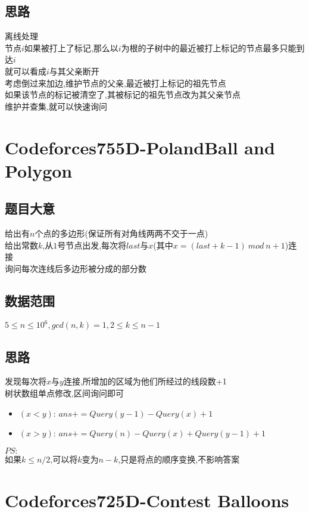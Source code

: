 \documentclass{ctexart}
\numberwithin{equation}{section}
\begin{document}
\begin{flushleft}
  \subsection{思路}
  离线处理\\
  节点$i$如果被打上了标记,那么以$i$为根的子树中的最近被打上标记的节点最多只能到达$i$\\
  就可以看成$i$与其父亲断开\\
  考虑倒过来加边,维护节点的父亲,最近被打上标记的祖先节点\\
  如果该节点的标记被清空了,其被标记的祖先节点改为其父亲节点\\ 
  维护并查集,就可以快速询问 \\
  \newpage

  \section{Codeforces755D-PolandBall and Polygon}
  \subsection{题目大意}
  给出有$n$个点的多边形(保证所有对角线两两不交于一点) \\
  给出常数$k$,从$1$号节点出发,每次将$last$与$x$(其中$x=(last+k-1) \ mod \ n+1$)连接 \\
  询问每次连线后多边形被分成的部分数 \\
  \subsection{数据范围}
  $5\le n\le 10^6,gcd(n,k)=1,2\le k\le n-1$ \\
  \subsection{思路}
  发现每次将$x$与$y$连接,所增加的区域为他们所经过的线段数+1 \\
  树状数组单点修改,区间询问即可 \\
  \begin{itemize}
  \item $(x<y)$: $ans += Query(y-1)-Query(x)+1$ 
  \item $(x>y)$: $ans += Query(n)-Query(x)+Query(y-1)+1$
  \end{itemize}
  $PS:$ \\
  如果$k\le n/2$,可以将$k$变为$n-k$,只是将点的顺序变换,不影响答案 \\
  \newpage

  \section{Codeforces725D-Contest Balloons}

\end{flushleft}
\end{document}
